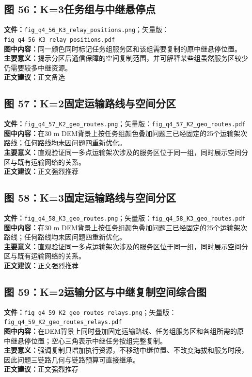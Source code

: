 \subsection*{图 56：K=3任务组与中继悬停点}
\textbf{文件：}\texttt{fig\_q4\_56\_K3\_relay\_positions.png}；矢量版：\texttt{fig\_q4\_56\_K3\_relay\_positions.pdf}\\
\textbf{图中内容：}同一颜色同时标记任务组服务区和该组需要复制的原中继悬停位置。\\
\textbf{主要意义：}揭示分区后通信保障的空间复制范围，并可解释某些组虽然服务区较少仍需要较多中继资源。\\
\textbf{正文建议：}正文备选

\subsection*{图 57：K=2固定运输路线与空间分区}
\textbf{文件：}\texttt{fig\_q4\_57\_K2\_geo\_routes.png}；矢量版：\texttt{fig\_q4\_57\_K2\_geo\_routes.pdf}\\
\textbf{图中内容：}在30 m DEM背景上按任务组颜色叠加问题三已经固定的25个运输架次路线；任何路线均未因问题四重新优化。\\
\textbf{主要意义：}直观验证同一多点运输架次涉及的服务区位于同一组，同时展示空间分区与既有运输网络的关系。\\
\textbf{正文建议：}正文强烈推荐

\subsection*{图 58：K=3固定运输路线与空间分区}
\textbf{文件：}\texttt{fig\_q4\_58\_K3\_geo\_routes.png}；矢量版：\texttt{fig\_q4\_58\_K3\_geo\_routes.pdf}\\
\textbf{图中内容：}在30 m DEM背景上按任务组颜色叠加问题三已经固定的25个运输架次路线；任何路线均未因问题四重新优化。\\
\textbf{主要意义：}直观验证同一多点运输架次涉及的服务区位于同一组，同时展示空间分区与既有运输网络的关系。\\
\textbf{正文建议：}正文强烈推荐

\subsection*{图 59：K=2运输分区与中继复制空间综合图}
\textbf{文件：}\texttt{fig\_q4\_59\_K2\_geo\_routes\_relays.png}；矢量版：\texttt{fig\_q4\_59\_K2\_geo\_routes\_relays.pdf}\\
\textbf{图中内容：}在DEM背景上同时叠加固定运输路线、任务组服务区和各组所需的原中继悬停位置；空心三角表示中继任务按组完整复制。\\
\textbf{主要意义：}强调复制只增加执行资源，不移动中继位置、不改变海拔和服务时段，因此问题三链路几何与链路预算可直接继承。\\
\textbf{正文建议：}正文强烈推荐

